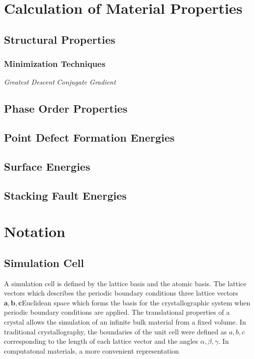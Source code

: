\section{Calculation of Material Properties}
\subsection{Structural Properties}
\subsubsection{Minimization Techniques}
\emph{Greatest Descent}
\emph{Conjugate Gradient}
\subsection{Phase Order Properties}
\subsection{Point Defect Formation Energies}
\subsection{Surface Energies}
\subsection{Stacking Fault Energies}

\section{Notation}
\subsection{Simulation Cell}
A simulation cell is defined by the lattice basis and the atomic basis.  The lattice vectors which describes the periodic boundary conditions three lattice vectors $\bm{a},\bm{b},\bm{c}$Euclidean space which forms the basis for the crystallographic system when periodic boundary conditions are applied.  The translational properties of a crystal allows the simulation of an infinite bulk material from a fixed volume.  In traditional crystallography, the boundaries of the unit cell were defined as $a,b,c$ corresponding to the length of each lattice vector and the angles $\alpha,\beta,\gamma$.  In computatonal materials, a more convenient representation

